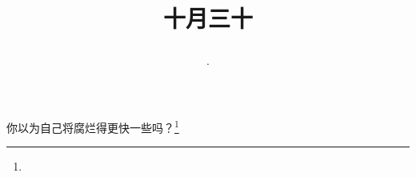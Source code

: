 \title{\date[d=30,m=11,y=2024][year:cn-y,年,month:cn,day:cn,日,·,weekday]·十月三十 }
你以为自己将腐烂得更快一些吗？\footnote{ }

